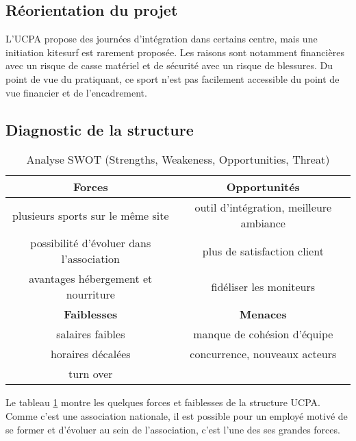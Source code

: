 \documentclass[11pt,a4paper]{report}
\begin{document}
\subsection{Réorientation du projet\label{reorientation}}

L'UCPA propose des journées d'intégration dans certains centre, mais
une initiation kitesurf est rarement proposée. Les raisons sont notamment
financières avec un risque de casse matériel et de sécurité avec un risque de blessures. Du point de vue du pratiquant, ce sport n'est pas facilement  accessible du point de vue financier et de l'encadrement.


\subsection{Diagnostic de la structure}
\begin{table}[h]
\centering
\begin{tabular}{|c|c|}
        \hline
        \textbf{Forces}                          & \textbf{Opportunités} \\ 
        \hline
        plusieurs sports sur le m\^eme site      &  outil d'intégration, meilleure ambiance\\
        possibilité d'évoluer dans l'association & plus de satisfaction client  \\
        avantages hébergement et nourriture      & fidéliser les moniteurs             \\
        \hline
        \textbf{Faiblesses}                      &  \textbf{Menaces} \\ 
        \hline
        salaires faibles                         & manque de cohésion d'équipe \\
        horaires décalées                         & concurrence, nouveaux acteurs   \\
        turn over                                &                               \\
        \hline
\end{tabular}
\caption{Analyse SWOT (Strengths, Weakeness, Opportunities, Threat)\label{swot}}
\end{table}
Le tableau \ref{swot} montre les quelques forces et faiblesses de la 
structure UCPA. Comme c'est une association nationale, il est 
possible pour un  employé motivé de se former et d'évoluer
au sein de l'association, c'est l'une des ses grandes forces.
 
\end{document}
